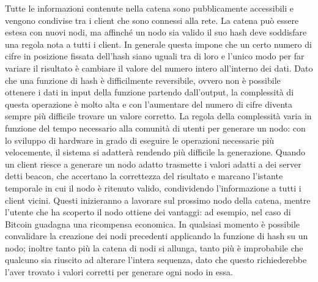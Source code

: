 	Tutte le informazioni contenute nella catena sono pubblicamente accessibili e vengono condivise tra i client che sono connessi alla rete. La catena può essere estesa con nuovi nodi, ma affinché un nodo sia valido il suo hash deve soddisfare una regola nota a tutti i client. In generale questa impone che un certo numero di cifre in posizione fissata dell'hash siano uguali tra di loro e l'unico modo per far variare il risultato è cambiare il valore del numero intero all'interno dei dati. Dato che una funzione di hash è difficilmente reversibile, ovvero non è possibile ottenere i dati in input della funzione partendo dall'output, la complessità di questa operazione è molto alta e con l'aumentare del numero di cifre diventa sempre più difficile trovare un valore corretto. La regola della complessità varia in funzione del tempo necessario alla comunità di utenti per generare un nodo: con lo sviluppo di hardware in grado di eseguire le operazioni necessarie più velocemente, il sistema si adatterà rendendo più difficile la generazione. Quando un client riesce a generare un nodo adatto trasmette i valori adatti a dei server detti beacon, che accertano la correttezza del risultato e marcano l'istante temporale in cui il nodo è ritenuto valido, condividendo l'informazione a tutti i client vicini. Questi inizieranno a lavorare sul prossimo nodo della catena, mentre l'utente che ha scoperto il nodo ottiene dei vantaggi: ad esempio, nel caso di Bitcoin guadagna una ricompensa economica. In qualsiasi momento è possibile convalidare la creazione dei nodi precedenti applicando la funzione di hash su un nodo; inoltre tanto più la catena di nodi si allunga, tanto più è improbabile che qualcuno sia riuscito ad alterare l'intera sequenza, dato che questo richiederebbe l'aver trovato i valori corretti per generare ogni nodo in essa.
	\\
